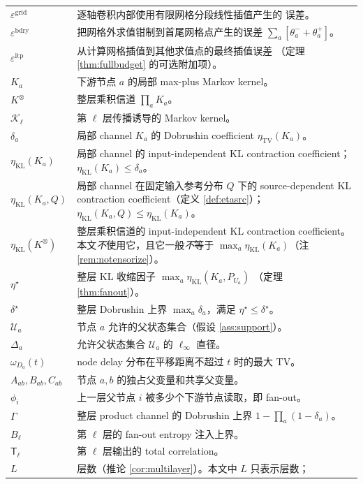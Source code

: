\documentclass[a4paper,11pt]{article}
\theoremstyle{definition}
\newcommand{\1}{\mathbf 1}
\newcommand{\TV}{\mathrm{TV}}
\newcommand{\KL}{\mathrm{KL}}
\newcommand{\Kprod}{K^{\otimes}}
\newcommand{\TCs}{\mathsf T}
\begin{document}
\begin{longtable}{>{\raggedright\arraybackslash}p{}
                  >{\raggedright\arraybackslash}p{}}
$\varepsilon^{\mathrm{grid}}$ & 逐轴卷积内部使用有限网格分段线性插值产生的
误差。\\
$\varepsilon^{\mathrm{bdry}}$ & 把网格外求值钳制到首尾网格点产生的误差
$\sum_a[\theta_a^-+\theta_a^+]$。\\
$\varepsilon^{\mathrm{itp}}$ & 从计算网格插值到其他求值点的最终插值误差
（定理 \ref{thm:fullbudget} 的可选附加项）。\\
$K_a$ & 下游节点 $a$ 的局部 max-plus Markov kernel。\\
$\Kprod$ & 整层乘积信道 $\prod_a K_a$。\\
$\mathcal K_\ell$ & 第 $\ell$ 层传播诱导的 Markov kernel。\\
$\delta_a$ & 局部 channel $K_a$ 的 Dobrushin coefficient
$\eta_{\TV}(K_a)$。\\
$\eta_{\KL}(K_a)$ & 局部 channel 的 input-independent KL contraction
coefficient；$\eta_{\KL}(K_a)\le\delta_a$。\\
$\eta_{\KL}(K_a,Q)$ & 局部 channel 在固定输入参考分布 $Q$ 下的
source-dependent KL contraction coefficient（定义 \ref{def:etasrc}）；
$\eta_{\KL}(K_a,Q)\le\eta_{\KL}(K_a)$。\\
$\eta_{\KL}(\Kprod)$ & 整层乘积信道的 input-independent KL contraction
coefficient。本文\emph{不}使用它，且它一般\emph{不}等于
$\max_a\eta_{\KL}(K_a)$（注 \ref{rem:notensorize}）。\\
$\eta^\star$ & 整层 KL 收缩因子 $\max_a\eta_{\KL}(K_a,P_{U_a})$
（定理 \ref{thm:fanout}）。\\
$\delta^\star$ & 整层 Dobrushin 上界 $\max_a\delta_a$，满足
$\eta^\star\le\delta^\star$。\\
$\mathcal U_a$ & 节点 $a$ 允许的父状态集合（假设 \ref{ass:support}）。\\
$\Delta_a$ & 允许父状态集合 $\mathcal U_a$ 的 $\ell_\infty$ 直径。\\
$\omega_{D_a}(t)$ & node delay 分布在平移距离不超过 $t$ 时的最大 TV。\\
$A_{ab},B_{ab},C_{ab}$ & 节点 $a,b$ 的独占父变量和共享父变量。\\
$\phi_i$ & 上一层父节点 $i$ 被多少个下游节点读取，即 fan-out。\\
$\Gamma$ & 整层 product channel 的 Dobrushin 上界
$1-\prod_a(1-\delta_a)$。\\
$B_\ell$ & 第 $\ell$ 层的 fan-out entropy 注入上界。\\
$\TCs_\ell$ & 第 $\ell$ 层输出的 total correlation。\\
$L$ & 层数（推论 \ref{cor:multilayer}）。本文中 $L$ 只表示层数；

\end{longtable}
\end{document}

